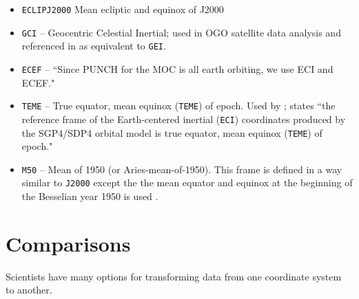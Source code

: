 \documentclass[draft]{agujournal2019}
\begin{document}
\begin{itemize}
    \item \texttt{ECLIPJ2000} Mean ecliptic and equinox of J2000 \cite{NAIFFrames2025}

    \item \texttt{GCI} -- Geocentric Celestial Inertial; used in OGO satellite data analysis \cite{NTRS1970} and referenced in  as equivalent to \texttt{GEI}.

    \item \texttt{ECEF} -- ``Since PUNCH for the MOC is all earth orbiting, we use ECI and ECEF."
     
    \item \texttt{TEME} -- True equator, mean equinox (\texttt{TEME}) of epoch. Used by ;  states ``the reference frame of the Earth-centered inertial (\texttt{ECI}) coordinates produced by the SGP4/SDP4 orbital model is true equator, mean equinox (\texttt{TEME}) of epoch."


    \item \texttt{M50} -- Mean of 1950 (or Aries-mean-of-1950). This frame is defined in a way similar to \texttt{J2000} except the the mean equator and equinox at the beginning of the Besselian year 1950 is used \cite{NASA1965}.
\end{itemize}


\section{Comparisons}
\label{sect:comparisons}

Scientists have many options for transforming data from one coordinate system to another.
\end{document}

